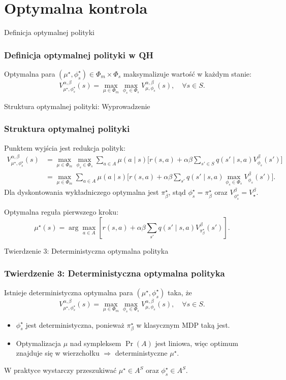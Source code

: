 \section{Optymalna kontrola}
\begin{frame}{Definicja optymalnej polityki}
\frametitle{Definicja optymalnej polityki w QH}
Optymalna para $(\mu^\star, \phi_s^\star) \in \Phi_m \times \Phi_s$ maksymalizuje wartość w każdym stanie:
\begin{equation}
V^{\alpha, \beta}_{\mu^\star, \phi_s^\star}(s) = \max_{\mu \in \Phi_m} \max_{\phi_s \in \Phi_s} V^{\alpha, \beta}_{\mu, \phi_s}(s), \quad \forall s \in S.
\end{equation}
\end{frame}

\begin{frame}{Struktura optymalnej polityki: Wyprowadzenie}
\frametitle{Struktura optymalnej polityki}
Punktem wyjścia jest redukcja polityk:
\begin{align}
V^{\alpha, \beta}_{\mu^\star, \phi_s^\star}(s) &= \max_{\mu \in \Phi_m} \max_{\phi_s \in \Phi_s} \sum_{a \in A} \mu(a\mid s) \Big[ r(s, a) + \alpha \beta \sum_{s' \in S} q(s'\mid s, a) V^{\beta}_{\phi_s}(s') \Big] \\
&= \max_{\mu \in \Phi_m} \sum_{a \in A} \mu(a\mid s) \Big[ r(s, a) + \alpha \beta \sum_{s'} q(s'\mid s, a) \max_{\phi_s \in \Phi_s} V^{\beta}_{\phi_s}(s') \Big].
\end{align}
\noindent
Dla dyskontowania wykładniczego optymalna jest $\pi_\beta^\star$, stąd $\phi_s^\star = \pi_\beta^\star$ oraz $V^{\beta}_{\phi_s^\star} = V^{\beta}_\star$.

Optymalna reguła pierwszego kroku:
\begin{equation}
\mu^\star(s) = \arg\max_{a \in A} \left[ r(s, a) + \alpha \beta \sum_{s'} q(s'\mid s, a) V^{\beta}_{\pi^\star_\beta}(s') \right].
\end{equation}
\end{frame}

\begin{frame}{Twierdzenie 3: Deterministyczna optymalna polityka}
\frametitle{Twierdzenie 3: Deterministyczna optymalna polityka}
Istnieje deterministyczna optymalna para $(\mu^\star, \phi_s^\star)$ taka, że
\begin{equation}
V^{\alpha, \beta}_{\mu^\star, \phi_s^\star}(s) = \max_{\mu \in \Phi_m} \max_{\phi_s \in \Phi_s} V^{\alpha, \beta}_{\mu, \phi_s}(s), \quad \forall s \in S.
\end{equation}
\begin{itemize}
\item $\phi_s^\star$ jest deterministyczna, ponieważ $\pi_\beta^\star$ w klasycznym MDP taką jest.
\item Optymalizacja $\mu$ nad sympleksem $\Pr(A)$ jest liniowa, więc optimum znajduje się w wierzchołku $\Rightarrow$ deterministyczne $\mu^\star$.
\end{itemize}
W praktyce wystarczy przeszukiwać $\mu^\star \in A^S$ oraz $\phi_s^\star \in A^S$.
\end{frame}

